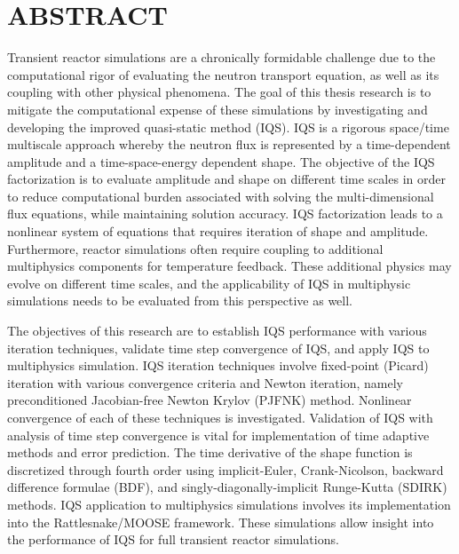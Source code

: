 %
%
%

\chapter*{ABSTRACT}

\pagestyle{plain} %
\setcounter{page}{2}

\indent Transient reactor simulations are a chronically formidable challenge due to the computational rigor of evaluating the neutron transport equation, as well as its coupling with other physical phenomena. The goal of this thesis research is to mitigate the computational expense of these simulations by investigating and developing the improved quasi-static method (IQS). IQS is a rigorous space/time multiscale approach whereby the neutron flux is represented by a time-dependent amplitude and a time-space-energy dependent shape.  The objective of the IQS factorization is to evaluate amplitude and shape on different time scales in order to reduce computational burden associated with solving the multi-dimensional flux equations, while maintaining solution accuracy. IQS factorization leads to a nonlinear system of equations that requires iteration of shape and amplitude. Furthermore, reactor simulations often require coupling to additional multiphysics components for temperature feedback. These additional physics may evolve on different time scales, and the applicability of IQS in multiphysic simulations needs to be evaluated from this perspective as well.

The objectives of this research are to establish IQS performance with various iteration techniques, validate time step convergence of IQS, and apply IQS to multiphysics simulation. IQS iteration techniques involve fixed-point (Picard) iteration with various convergence criteria and Newton iteration, namely preconditioned Jacobian-free Newton Krylov (PJFNK) method. Nonlinear convergence of each of these techniques is investigated. Validation of IQS with analysis of time step convergence is vital for implementation of time adaptive methods and error prediction. The time derivative of the shape function is discretized through fourth order using implicit-Euler, Crank-Nicolson, backward difference formulae (BDF), and singly-diagonally-implicit Runge-Kutta (SDIRK) methods. IQS application to multiphysics simulations involves its implementation into the Rattlesnake/MOOSE framework. These simulations allow insight into the performance of IQS for full transient reactor simulations.

